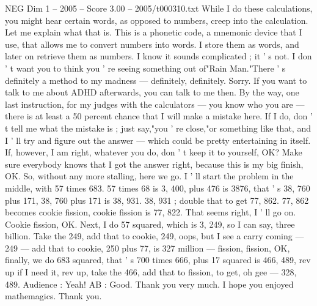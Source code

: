 \begin{textsample}{NEG Dim 1 – 2005 – Score 3.00 – 2005/t000310.txt}
While I do these calculations, you might hear certain words, as opposed to numbers, creep into the calculation.
Let me explain what that is.
This is a phonetic code, a mnemonic device that I use, that allows me to convert numbers into words.
I store them as words, and later on retrieve them as numbers.
I know it sounds complicated ; it ' s not.
I don ' t want you to think you ' re seeing something out of"Rain Man."There ' s definitely a method to my madness — definitely, definitely.
Sorry.
If you want to talk to me about ADHD afterwards, you can talk to me then.
By the way, one last instruction, for my judges with the calculators — you know who you are — there is at least a 50 percent chance that I will make a mistake here.
If I do, don ' t tell me what the mistake is ; just say,"you ' re close,"or something like that, and I ' ll try and figure out the answer — which could be pretty entertaining in itself.
If, however, I am right, whatever you do, don ' t keep it to yourself, OK?
Make sure everybody knows that I got the answer right, because this is my big finish, OK.
So, without any more stalling, here we go.
I ' ll start the problem in the middle, with 57 times 683. 57 times 68 is 3, 400, plus 476 is 3876, that ' s 38, 760 plus 171, 38, 760 plus 171 is 38, 931. 38, 931 ; double that to get 77, 862. 77, 862 becomes cookie fission, cookie fission is 77, 822.
That seems right, I ' ll go on.
Cookie fission, OK.
Next, I do 57 squared, which is 3, 249, so I can say, three billion.
Take the 249, add that to cookie, 249, oops, but I see a carry coming — 249 — add that to cookie, 250 plus 77, is 327 million — fission, fission, OK, finally, we do 683 squared, that ' s 700 times 666, plus 17 squared is 466, 489, rev up if I need it, rev up, take the 466, add that to fission, to get, oh gee — 328, 489.
Audience : Yeah!
AB : Good.
Thank you very much.
I hope you enjoyed mathemagics.
Thank you.

\end{textsample}
